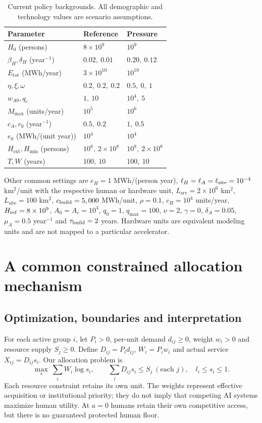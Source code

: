 \documentclass[12pt,a4paper]{article}
\theoremstyle{remark}
\newcommand{\Etotal}{E_{\mathrm{tot}}}
\newcommand{\Hext}{H_{\mathrm{ext}}}
\newcommand{\Hmin}{H_{\min}}
\newcommand{\Lservice}{L_{\mathrm{srv}}}
\newcommand{\Lsite}{L_{\mathrm{site}}}
\begin{document}
\begin{table}[htbp]\centering\small
\caption{Current policy backgrounds. All demographic and technology values are scenario assumptions.}\label{tab:background}
\begin{tabular}{@{}lll@{}}\toprule
Parameter & Reference & Pressure\\\midrule
$H_0$ (persons) & $8\times10^9$ & $10^9$\\
$\beta_H,\delta_H$ (year$^{-1}$) & $0.02,\ 0.01$ & $0.20,\ 0.12$\\
$\Etotal$ (MWh/year) & $3\times10^{10}$ & $10^{10}$\\
$\eta,\xi,\omega$ & $0.2,\ 0.2,\ 0.2$ & $0.5,\ 0,\ 1$\\
$w_{A0},q_c$ & $1,\ 10$ & $10^4,\ 5$\\
$M_{\max}$ (units/year) & $10^5$ & $10^6$\\
$c_A,r_0$ (year$^{-1}$) & $0.5,\ 0.2$ & $1,\ 0.5$\\
$e_0$ (MWh/(unit year)) & $10^4$ & $10^4$\\
$\Hext,\Hmin$ (persons) & $10^8,\ 2\times10^8$ & $10^8,\ 2\times10^8$\\
$T,W$ (years) & $100,\ 10$ & $100,\ 10$\\
\bottomrule\end{tabular}

\end{table}

Other common settings are $e_H=1$ MWh/(person year), $\ell_H=\ell_A=\ell_{\rm site}=10^{-4}$ km$^2$/unit with the respective human or hardware unit, $\Lservice=2\times10^6$ km$^2$, $\Lsite=100$ km$^2$, $c_{\rm build}=5,000$ MWh/unit, $\rho=0.1$, $c_H=10^4$ units/year, $H_{\rm ref}=8\times10^9$, $A_0=A_c=10^4$, $q_0=1$, $q_{\max}=100$, $\nu=2$, $\gamma=0$, $\delta_A=0.05$, $\mu_A=0.5$ year$^{-1}$ and $\tau_{\rm build}=2$ years. Hardware units are equivalent modeling units and are not mapped to a particular accelerator.

\section{A common constrained allocation mechanism}\label{sec:allocation}
\subsection{Optimization, boundaries and interpretation}
For each active group $i$, let $P_i>0$, per-unit demand $d_{ij}\ge0$, weight $w_i>0$ and resource supply $S_j\ge0$. Define $D_{ij}=P_id_{ij}$, $W_i=P_iw_i$ and actual service $X_{ij}=D_{ij}s_i$. Our allocation problem is
\begin{equation}\label{eq:alloc}
\max_s\ \sum_iW_i\log s_i,\qquad
\sum_iD_{ij}s_i\le S_j\ (\text{each }j),\quad l_i\le s_i\le1.
\end{equation}
Each resource constraint retains its own unit. The weights represent effective acquisition or institutional priority; they do not imply that competing AI systems maximize human utility. At $a=0$ humans retain their own competitive access, but there is no guaranteed protected human floor.
\end{document}
